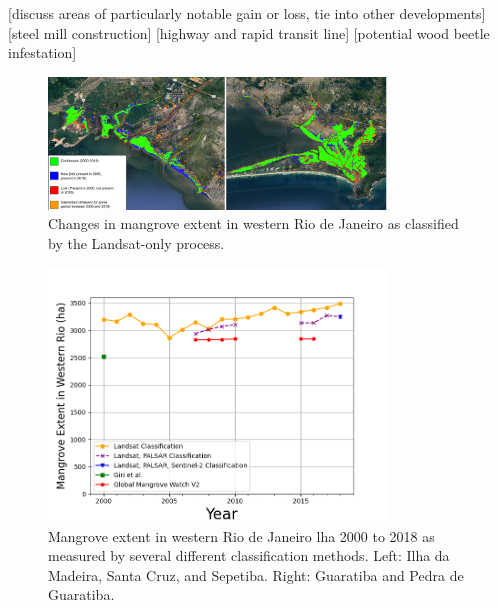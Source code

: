 [discuss areas of particularly notable gain or loss, tie into other developments]
	[steel mill construction]
	[highway and rapid transit line]
	[potential wood beetle infestation]
	
\begin{figure}[H] 
\centering
\includegraphics[width=0.8\textwidth]{Figures/chap4/extent_changes.png}
\caption[Changes in Mangrove Extent 2000-2018]{Changes in mangrove extent in western Rio de Janeiro as classified by the Landsat-only process.}
\label{fig:extent-changes}
\end{figure}

	
\begin{figure}[H] 
\centering
\includegraphics[width=0.8\textwidth]{Figures/chap4/extent_over_time.png}
\caption[Mangrove Extent Over Time]{Mangrove extent in western Rio de Janeiro lha 2000 to 2018 as measured by several different classification methods. Left: Ilha da Madeira, Santa Cruz, and Sepetiba. Right: Guaratiba and Pedra de Guaratiba.}
\label{fig:extent-over-time}
\end{figure}



\subsubsection{} 

